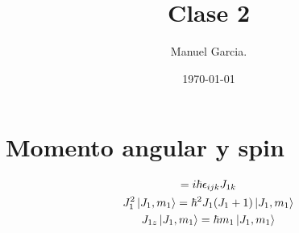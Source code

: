\documentclass{article}
\title{Clase 2 }
\author{Manuel Garcia.}
\date{\today}
\begin{document}
\maketitle

\section{Momento angular y spin }
\begin{gather*}
  [J _{1i } , J _{1,j } ] = i \hbar  \epsilon _{ijk } J _{1k } \\
  J _{1 } ^2 \ket{J_1, m_1 } = \hbar ^2 J_1(J_1 + 1) \ket{J_1,m_1 }\\
  J _{1z } \ket{J_1 , m_1 } = \hbar m_1 \ket{J_1, m_1 }
\end{gather*}
\end{document}
